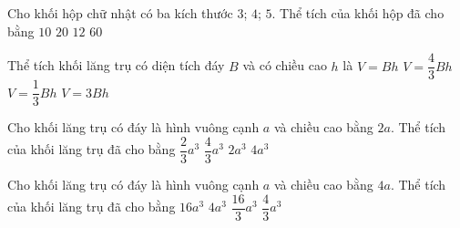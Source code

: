 

\begin{ex}%
	Cho khối hộp chữ nhật có ba  kích thước $3$; $4$; $5$. Thể tích của khối hộp đã cho bằng
	\choice 
		{$10$} 
		 {$20$}
		{$12$} 
		{\True $60$} 
\end{ex}

\begin{ex}%
	Thể tích khối lăng trụ có  diện tích đáy $B$ và có chiều cao $h$ là
	\choice 
		 {\True $V = Bh$}
		 {$V = \dfrac{4}{3}Bh$}
		{$V  = \dfrac{1}{3}Bh$}
		{$V =  3Bh$}
\end{ex}

\begin{ex}%
	Cho khối lăng trụ có đáy là hình vuông cạnh $a$ và chiều cao bằng $2a$. Thể tích  của khối lăng trụ đã cho bằng
	\choice 
		{$\dfrac{2}{3}a^3$} 
		{$\dfrac{4}{3}a^3$} 
		{\True $2a^3$} 
		{$4a^3$} 
\end{ex}

\begin{ex}%
	Cho khối lăng trụ có đáy là hình vuông cạnh $a$ và chiều cao bằng $4a$. Thể  tích của khối lăng trụ đã cho bằng
	\choice 
		 {$16a^3$}
		 {\True $4a^3$}
		{$\dfrac{16}{3}a^3$} 
		{$\dfrac{4}{3}a^3$} 
\end{ex}

